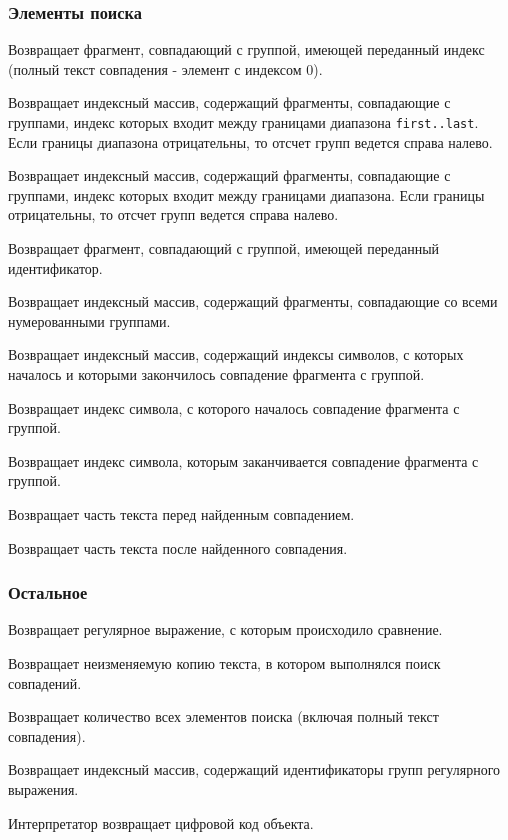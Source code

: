 \subsubsection*{Элементы поиска}

\begin{methodlist}
  Возвращает фрагмент, совпадающий с группой, имеющей переданный индекс (полный  текст совпадения - элемент с индексом 0).

  Возвращает индексный массив, содержащий фрагменты, совпадающие с группами, индекс которых входит между границами диапазона \verb!first..last!. Если границы диапазона отрицательны, то отсчет групп ведется справа налево.

  Возвращает индексный массив, содержащий фрагменты, совпадающие с группами, индекс которых входит между границами диапазона. Если границы отрицательны, то отсчет групп ведется справа налево.

  Возвращает фрагмент, совпадающий с группой, имеющей переданный идентификатор.

  Возвращает индексный массив, содержащий фрагменты, совпадающие со всеми нумерованными группами.

  Возвращает индексный массив, содержащий индексы символов, с которых началось и которыми закончилось совпадение фрагмента с группой.

  Возвращает индекс символа, с которого началось совпадение фрагмента с группой.

  Возвращает индекс символа, которым заканчивается совпадение фрагмента с группой.

  Возвращает часть текста перед найденным совпадением.

  Возвращает часть текста после найденного совпадения.
\end{methodlist}

\subsubsection*{Остальное}

\begin{methodlist}
  Возвращает регулярное выражение, с которым происходило сравнение.

  Возвращает неизменяемую копию текста, в котором выполнялся поиск совпадений.

  Возвращает количество всех элементов поиска (включая полный текст совпадения).

  Возвращает индексный массив, содержащий идентификаторы групп регулярного выражения.

  Интерпретатор возвращает цифровой код объекта.
\end{methodlist}

